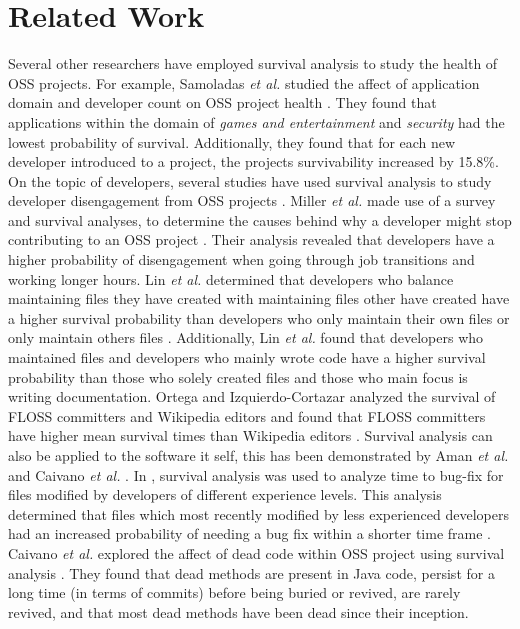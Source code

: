 \documentclass[acmconf]{acmart}
\begin{document}
\section{Related Work} \label{related}

Several other researchers have employed survival analysis to study the health of OSS projects. 
For example, Samoladas \emph{et al.} studied the affect of application domain and developer count on OSS project health \cite{samoladas2010survival}. 
They found that applications within the domain of \emph{games and entertainment} and \emph{security} had the lowest probability of survival. 
Additionally, they found that for each new developer introduced to a project, the projects survivability increased by 15.8\%. 
On the topic of developers, several studies have used survival analysis to study developer disengagement from OSS projects \cite{miller2019people,lin2017developer,ortega2009survival}. 
Miller \emph{et al.} made use of a survey and survival analyses, to determine the causes behind why a developer might stop contributing to an OSS project \cite{miller2019people}. 
Their analysis revealed that developers have a higher probability of disengagement when going through job transitions and working longer hours. 
Lin \emph{et al.} determined that developers who balance maintaining files they have created with maintaining files other have created have a higher survival probability than developers who only maintain their own files or only maintain others files \cite{lin2017developer}. Additionally, Lin \emph{et al.} found that developers who maintained files and developers who mainly wrote code have a higher survival probability than those who solely created files and those who main focus is writing documentation. 
Ortega and Izquierdo-Cortazar analyzed the survival of FLOSS committers and Wikipedia editors and found that FLOSS committers have higher mean survival times than Wikipedia editors \cite{ortega2009survival}. 
Survival analysis can also be applied to the software it self, this has been demonstrated by Aman \emph{et al.} and Caivano \emph{et al.} \cite{aman2017survival, caivano2021exploratory}. 
In \cite{aman2017survival}, survival analysis was used to analyze time to bug-fix for files modified by developers of different experience levels. 
This analysis determined that files which most recently modified by less experienced developers had an increased probability of needing a bug fix within a shorter time frame \cite{aman2017survival}. 
Caivano \emph{et al.} explored the affect of dead code within OSS project using survival analysis \cite{caivano2021exploratory}. 
They found that dead methods are present in Java code, persist for a long time (in terms of commits) before being buried or revived, are rarely revived, and that most dead methods have been dead since their inception. 
\end{document}
